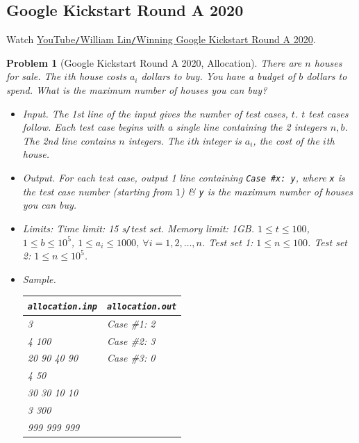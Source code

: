 \documentclass{article}
\newtheorem{problem}{Problem}
\begin{document}

\subsection{Google Kickstart Round A 2020}
Watch \href{https://www.youtube.com/watch?v=uGrBHohIgQY}{YouTube{\tt /}William Lin{\tt /}Winning Google Kickstart Round A 2020}.

\begin{problem}[Google Kickstart Round A 2020, Allocation]
	There are $n$ houses for sale. The $i$th house costs $a_i$ dollars to buy. You have a budget of $b$ dollars to spend. What is the maximum number of houses you can buy?
	\begin{itemize}
		\item {\sf Input.} The 1st line of the input gives the number of test cases, $t$. $t$ test cases follow. Each test case begins with a single line containing the 2 integers $n,b$. The 2nd line contains $n$ integers. The $i$th integer is $a_i$, the cost of the $i$th house.
		\item {\sf Output.} For each test case, output 1 line containing \verb|Case #x: y|, where {\tt x} is the test case number (starting from $1$) \& {\tt y} is the maximum number of houses you can buy.
		\item {\sf Limits:} Time limit: \emph{15 s{\tt /}test set}. Memory limit: \emph{1GB}. $1\le t\le100$, $1\le b\le10^5$, $1\le a_i\le1000$, $\forall i = 1,2,\ldots,n$. Test set 1: $1\le n\le100$. Test set 2: $1\le n\le10^5$.
		\item {\sf Sample.}
		\begin{table}[H]
			\centering
			\begin{tabular}{|l|l|}
				\hline
				{\tt allocation.inp} & {\tt allocation.out} \\
				\hline
				3 & Case \#1: 2 \\
				4 100 & Case \#2: 3 \\
				20 90 40 90 & Case \#3: 0 \\
				4 50 & \\
				30 30 10 10 & \\
				3 300 & \\
				999 999 999 & \\
				\hline
			\end{tabular}
		\end{table}
	\end{itemize}
\end{problem}
\end{document}

